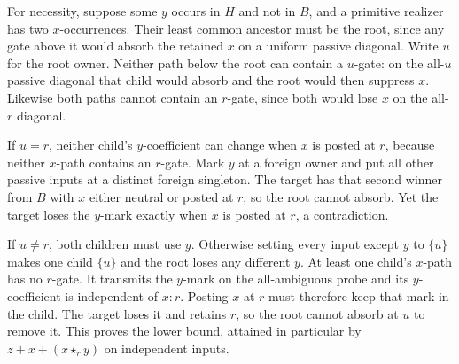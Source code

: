 For necessity, suppose some $y$ occurs in $H$
and not in $B$, and a primitive realizer has
two $x$-occurrences. Their least common ancestor
must be the root, since any gate above it would
absorb the retained $x$ on a uniform passive
diagonal. Write $u$ for the root owner. Neither
path below the root can contain a $u$-gate: on
the all-$u$ passive diagonal that child would
absorb and the root would then suppress $x$.
Likewise both paths cannot contain an $r$-gate,
since both would lose $x$ on the all-$r$ diagonal.

If $u=r$, neither child's $y$-coefficient can
change when $x$ is posted at $r$, because neither
$x$-path contains an $r$-gate. Mark $y$ at a
foreign owner and put all other passive inputs
at a distinct foreign singleton. The target has
that second winner from $B$ with $x$ either neutral
or posted at $r$, so the root cannot absorb.
Yet the target loses the $y$-mark exactly when
$x$ is posted at $r$, a contradiction.

If $u\ne r$, both children must use $y$.
Otherwise setting every input except $y$ to
$\{u\}$ makes one child $\{u\}$ and the root
loses any different $y$. At least one child's
$x$-path has no $r$-gate. It transmits the $y$-mark
on the all-ambiguous probe and its $y$-coefficient
is independent of $x:r$. Posting $x$ at $r$
must therefore keep that mark in the child.
The target loses it and retains $r$, so the root
cannot absorb at $u$ to remove it. This proves
the lower bound, attained in particular by
$z+x+(x\star_r y)$ on independent inputs.

